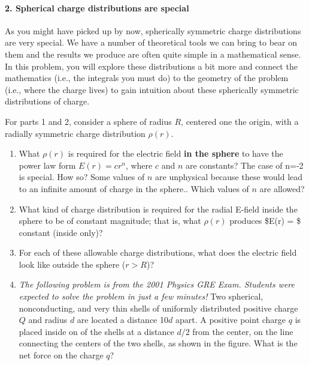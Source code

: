 \documentclass[11pt]{article}
\def\tightlist{}
\begin{document}
\paragraph{2. Spherical charge distributions are
special}\label{spherical-charge-distributions-are-special}

As you might have picked up by now, spherically symmetric charge
distributions are very special. We have a number of theoretical tools we
can bring to bear on them and the results we produce are often quite
simple in a mathematical sense. In this problem, you will explore these
distributions a bit more and connect the mathematics (i.e., the
integrals you must do) to the geometry of the problem (i.e., where the
charge lives) to gain intuition about these spherically symmetric
distributions of charge.

For parts 1 and 2, consider a sphere of radius \(R\), centered one the
origin, with a radially symmetric charge distribution \(\rho(r)\).

\begin{enumerate}
\def\labelenumi{\arabic{enumi}.}
\tightlist
\item
  What \(\rho(r)\) is required for the electric field \textbf{in the
  sphere} to have the power law form \(E(r) = cr^n\), where \(c\) and
  \(n\) are constants? The case of n=-2 is special. How so? Some values
  of \(n\) are unphysical because these would lead to an infinite amount
  of charge in the sphere.. Which values of \(n\) are allowed?
\item
  What kind of charge distribution is required for the radial E-field
  inside the sphere to be of constant magnitude; that is, what
  \(\rho(r)\) produces \$E(r) = \$ constant (inside only)?
\item
  For each of these allowable charge distributions, what does the
  electric field look like outside the sphere (\(r>R\))?
\item
  \emph{The following problem is from the 2001 Physics GRE Exam.
  Students were expected to solve the problem in just a few minutes!}
  Two spherical, nonconducting, and very thin shells of uniformly
  distributed positive charge \(Q\) and radius \(d\) are located a
  distance 10\(d\) apart. A positive point charge \(q\) is placed inside
  on of the shells at a distance \(d/2\) from the center, on the line
  connecting the centers of the two shells, as shown in the figure. What
  is the net force on the charge \(q\)?
\end{enumerate}
\end{document}
